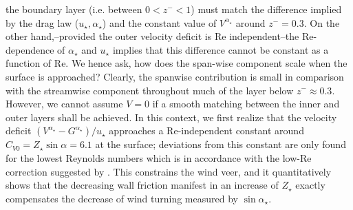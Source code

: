 \documentclass[smallcondensed,final]{svjour3}
\newcommand{\RE}{\mathrm{Re}}
\begin{document}
the boundary layer (i.e. between $0<z^-<1$) must match the difference implied by the drag law ($u_\star, \alpha_\star$)
and the constant value of $V^{\alpha_\star}$ around $z^-=0.3$.
%
On the other hand,--provided the outer velocity deficit is $\RE$ independent--the $\RE$-dependence
of $\alpha_\star$ and $u_\star$ implies that this difference cannot be constant as a function of $\RE$.
%
%
We hence ask, how does the span-wise component scale when the surface is approached?
%
Clearly, the spanwise contribution is small in comparison with the streamwise component
throughout much of the layer below $z^-\approx 0.3$. 
%
However, we cannot assume $V=0$ if a smooth matching between the inner and outer layers shall be achieved. 
%
In this context, we first realize that the velocity deficit $(V^{\alpha_\star}-G^{\alpha_\star})/u_\star$
approaches a $\RE$-independent constant around $C_{V0}=Z_\star \sin\alpha=6.1$ at the surface; deviations from
this constant are only found for the lowest Reynolds numbers which is in accordance with
the low-$\RE$ correction suggested by \cite{spalart:JFM1989}.
%
This constrains the wind veer, and it quantitatively shows that the decreasing wall friction manifest in an
increase of $Z_\star$ exactly compensates the decrease of wind turning measured by $\sin\alpha_\star$. 
\end{document}
